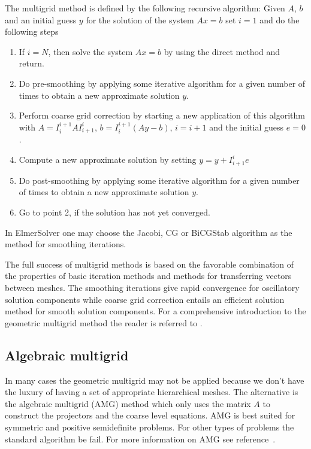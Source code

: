 The multigrid method is defined by the following recursive algorithm: 
Given $A$, $b$ and an initial guess $y$ for the solution of the system $Ax=b$ set $i=1$ 
and do the following steps  
\begin{enumerate}
\item If $i=N$, then solve the system $Ax=b$ by using the direct method
	and return.
\item Do pre-smoothing by applying some iterative algorithm 
for a given number of times to obtain a new approximate solution $y$.
\item Perform coarse grid correction by starting 
	a new application of this algorithm with 
	$A=I_{i}^{i+1}AI_{i+1}^{i}$, $b=I_{i}^{i+1}(Ay-b)$,	
	$i=i+1$ and the initial guess $e=0$.
\item Compute a new approximate solution by setting $y = y + I_{i+1}^{i}e$
\item Do post-smoothing by applying some iterative algorithm for a given number of times
	to obtain a new approximate solution $y$.
\item Go to point 2, if the solution has not yet converged.
\end{enumerate}
In ElmerSolver one may choose the Jacobi, CG or BiCGStab algorithm as the method for smoothing
iterations. 

The full success of multigrid methods is based on the favorable combination of the properties 
of basic iteration methods and methods for transferring vectors between meshes. 
The smoothing iterations give rapid convergence for    
oscillatory solution components while coarse grid correction entails an efficient 
solution method for smooth solution components. For a comprehensive 
introduction to the geometric multigrid method the reader is referred to \cite{Briggs87}.     





\subsection{Algebraic multigrid}

In many cases the geometric multigrid may not be applied because we don't have the 
luxury of having a set of appropriate hierarchical meshes. The alternative is the 
algebraic multigrid (AMG) method which only uses the matrix $A$ to construct the projectors and the 
coarse level equations. AMG is best suited for symmetric and positive semidefinite problems.
For other types of problems the standard algorithm be fail. For more information on 
AMG see reference~\cite{stuben99}. 
 
